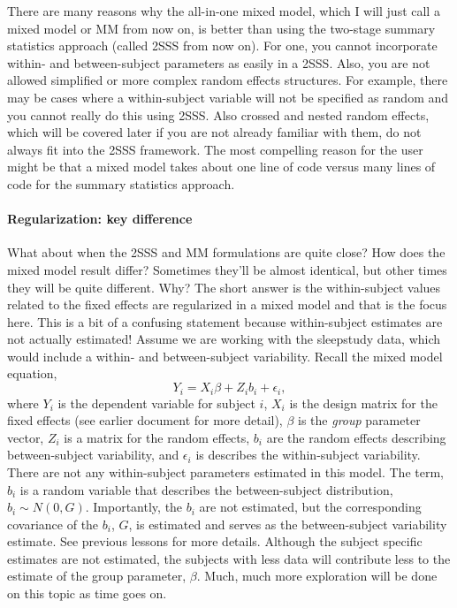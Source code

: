 \documentclass[]{book}
\let\oldparagraph\paragraph
\renewcommand{\paragraph}[1]{\oldparagraph{#1}\mbox{}}
\begin{document}
There are many reasons why the all-in-one mixed model, which I will just
call a mixed model or MM from now on, is better than using the two-stage
summary statistics approach (called 2SSS from now on). For one, you
cannot incorporate within- and between-subject parameters as easily in a
2SSS. Also, you are not allowed simplified or more complex random
effects structures. For example, there may be cases where a
within-subject variable will not be specified as random and you cannot
really do this using 2SSS. Also crossed and nested random effects, which
will be covered later if you are not already familiar with them, do not
always fit into the 2SSS framework. The most compelling reason for the
user might be that a mixed model takes about one line of code versus
many lines of code for the summary statistics approach.

\paragraph{Regularization: key
difference}\label{regularization-key-difference}

What about when the 2SSS and MM formulations are quite close? How does
the mixed model result differ? Sometimes they'll be almost identical,
but other times they will be quite different. Why? The short answer is
the within-subject values related to the fixed effects are regularized
in a mixed model and that is the focus here. This is a bit of a
confusing statement because within-subject estimates are not actually
estimated! Assume we are working with the sleepstudy data, which would
include a within- and between-subject variability. Recall the mixed
model equation, \[Y_i = X_i\beta + Z_ib_i + \epsilon_i,\] where \(Y_i\)
is the dependent variable for subject \(i\), \(X_i\) is the design
matrix for the fixed effects (see earlier document for more detail),
\(\beta\) is the \emph{group} parameter vector, \(Z_i\) is a matrix for
the random effects, \(b_i\) are the random effects describing
between-subject variability, and \(\epsilon_i\) is describes the
within-subject variability. There are not any within-subject parameters
estimated in this model. The term, \(b_i\) is a random variable that
describes the between-subject distribution, \(b_i \sim N(0, G)\).
Importantly, the \(b_i\) are not estimated, but the corresponding
covariance of the \(b_i\), \(G\), is estimated and serves as the
between-subject variability estimate. See previous lessons for more
details. Although the subject specific estimates are not estimated, the
subjects with less data will contribute less to the estimate of the
group parameter, \(\beta\). Much, much more exploration will be done on
this topic as time goes on.
\end{document}
